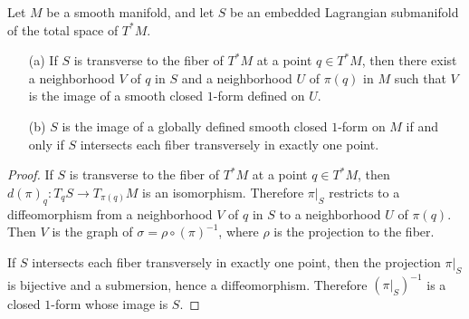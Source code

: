 \begin{proposition}\label{submani of T^*M is section iff}
Let $M$ be a smooth manifold, and let $S$ be an embedded Lagrangian submanifold of the total space of $T^*M$.
\begin{itemize}
\item[(a)] If $S$ is transverse to the fiber of $T^*M$ at a point $q\in T^*M$, then there exist a neighborhood $V$ of $q$ in $S$ and a neighborhood $U$ of $\pi(q)$ in $M$ such that $V$ is the image of a smooth closed $1$-form defined on $U$.
\item[(b)] $S$ is the image of a globally defined smooth closed $1$-form on $M$ if and only if $S$ intersects each fiber transversely in exactly one point.
\end{itemize}
\end{proposition}
\begin{proof}
If $S$ is transverse to the fiber of $T^*M$ at a point $q\in T^*M$, then $d(\pi)_q:T_{q}S\to T_{\pi(q)}M$ is an isomorphism. Therefore $\pi|_S$ restricts to a diffeomorphism from a neighborhood $V$ of $q$ in $S$ to a neighborhood $U$ of $\pi(q)$. Then $V$ is the graph of $\sigma=\rho\circ(\pi)^{-1}$, where $\rho$ is the projection to the fiber.\par
If $S$ intersects each fiber transversely in exactly one point, then the projection $\pi|_S$ is bijective and a submersion, hence a diffeomorphism. Therefore $(\pi|_S)^{-1}$ is a closed $1$-form whose image is $S$.
\end{proof}

